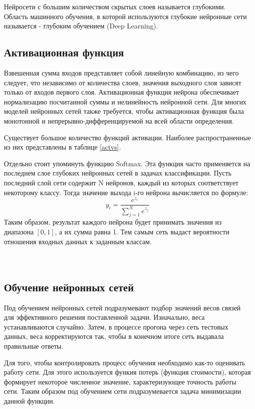 Нейросети с большим количеством скрытых слоев называется глубокими. Область машинного обучения, в которой используются глубокие нейронные сети называется - глубоким обучением (Deep Learning).     

\subsection{Активационная функция}
\label{sec:activation}
Взвешенная сумма входов представляет собой линейную комбинацию, из чего следует, что независимо от количества слоев, значения выходного слоя зависят только от входов первого слоя. 
Активационная функция нейрона обеспечивает нормализацию посчитанной суммы и нелинейность нейронной сети. Для многих моделей нейронных сетей также требуется, чтобы активационная функция была монотонной и непрерывно-дифференцируемой на всей области определения.

Существует большое количество функций активации. Наиболее распространенные из них представлены в таблице \ref{actvs}.



Отдельно стоит упоминуть функцию Softmax. Эта функция часто применяется на последнем слое глубоких нейронных сетей в задачах классификации. Пусть последний слой сети содержит N нейронов, каждый из которых соответствует некоторому классу. Тогда значение выхода i-го нейрона вычисляется по формуле: 
\[
    y_i=\frac{e^{z_i}}{\sum_{j=1}^{N}e^{z_j}}
\]
Таким образом, результат каждого нейрона будет принимать значения из диапазона $[0,1]$, а их сумма равна 1. Тем самым сеть выдаст вероятности отношения входных данных к заданным классам.
\\\\\\
\subsection{Обучение нейронных сетей}
Под обучением нейронных сетей подразумевают подбор значений весов связей для эффективного решения поставленной задачи. Изначально, веса устанавливаются случайно. Затем, в процессе прогона через сеть тестовых данных, веса корректируются так, чтобы в конечном итоге сеть выдавала правильные ответы. 

Для того, чтобы контролировать процесс обучения необходимо как-то оценивать работу сети. Для этого используется функия потерь (функция стоимости), которая формирует некоторое численное значение, характеризующее точность работы сети. Таким образом под обучением сети подразумевается задача минимизации данной функции.

